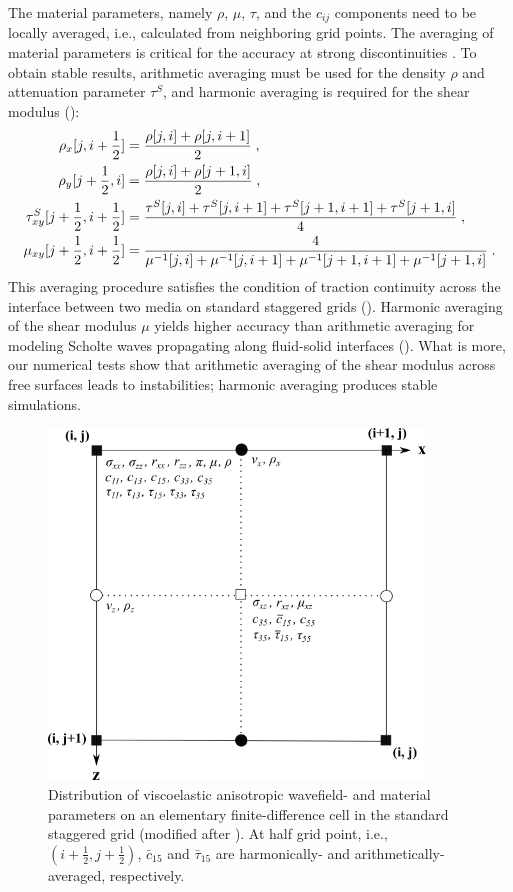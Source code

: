 The material parameters, namely $\rho$, $\mu$, $\tau$, and the $c_{ij}$ components need to be locally averaged, i.e., calculated from neighboring grid points. The averaging of material parameters is critical for the accuracy at strong discontinuities \cite{zahradnik:93,falk:98,moczo:02}. To obtain stable results, arithmetic averaging  must be used for the density $\rho$ and attenuation parameter $\tau^S$, and harmonic averaging is required for the shear modulus (\cite{fellinger:95,graves:96,falk:98,vossen:02,moczo:02}):
\begin{subequations}
\allowdisplaybreaks
    \begin{align}
        \rho_x[j,i+\frac{1}{2}] &= \frac{\rho[j,i]+\rho[j,i+1]}{2}\;,\\
        \rho_y[j+\frac{1}{2},i] &= \frac{\rho[j,i]+\rho[j+1,i]}{2}\;,\\
        \tau^S_{xy}[j+\frac{1}{2},i+\frac{1}{2}] &= \frac{\tau^S[j,i]+\tau^S[j,i+1]+\tau^S[j+1,i+1]+\tau^S[j+1,i]}{4}\;,\\
        \mu_{xy}[j+\frac{1}{2},i+\frac{1}{2}] &= \frac{4}{\mu^{-1}[j,i]+\mu^{-1}[j,i+1]+\mu^{-1}[j+1,i+1]+\mu^{-1}[j+1,i]}\;.
        \label{eq:stress_vti}
    \end{align}
\end{subequations}
This averaging procedure satisfies the condition of traction continuity across the interface between two media on standard staggered grids (\cite{moczo:02}). Harmonic averaging of the shear modulus $\mu$ yields higher accuracy than arithmetic averaging for modeling Scholte waves propagating along fluid-solid interfaces (\cite{falk:98}). What is more, our numerical tests show that arithmetic averaging of the shear modulus across free surfaces leads to instabilities; harmonic averaging produces stable simulations. 
\begin{figure}[ht!]
    \centering
    \includegraphics[width=10cm]{figures/ssg_final.png}
    \caption{Distribution of viscoelastic anisotropic wavefield- and material parameters on an elementary finite-difference cell in the standard staggered grid (modified after \cite{virieux:86}).
    At half grid point, i.e., $(i+\frac{1}{2},j+\frac{1}{2})$, $\bar{c}_{15}$ and $\bar{\tau}_{15}$ are harmonically- and arithmetically-averaged, respectively.}
    \label{fig:ssg}
\end{figure}

